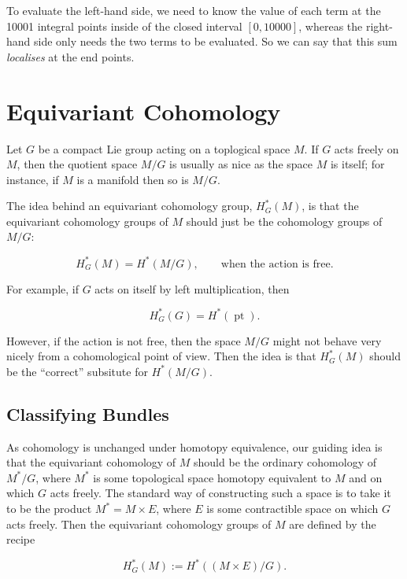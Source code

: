 \documentclass{article}
\DeclareMathOperator{\pt}{pt}
\begin{document}
To evaluate the left-hand side, we need to know the value of each term at the 10001 integral points inside of the closed interval $[0, 10000]$, whereas the right-hand side only needs the two terms to be evaluated. So we can say that this sum \emph{localises} at the end points.

\section{Equivariant Cohomology}

Let $G$ be a compact Lie group acting on a toplogical space $M$. If $G$ acts freely on $M$, then the quotient space $M/G$ is usually as nice as the space $M$ is itself; for instance, if $M$ is a manifold then so is $M/G$.

The idea behind an equivariant cohomology group, $H_{G}^{\ast}(M)$, is that the equivariant cohomology groups of $M$ should just be the cohomology groups of $M/G$:

\begin{equation*}
	H_{G}^{\ast}(M) = H^{\ast}(M/G), \qquad \text{when the action is free.}
\end{equation*}

For example, if $G$ acts on itself by left multiplication, then

\begin{equation*}
	H_{G}^{\ast}(G) = H^{\ast}(\pt).
\end{equation*}

However, if the action is not free, then the space $M/G$ might not behave very nicely from a cohomological point of view. Then the idea is that $H_{G}^{\ast}(M)$ should be the ``correct'' subsitute for $H^{\ast}(M/G)$.

\subsection{Classifying Bundles}

As cohomology is unchanged under homotopy equivalence, our guiding idea is that the equivariant cohomology of $M$ should be the ordinary cohomology of $M^{\ast}/G$, where $M^{\ast}$ is some topological space homotopy equivalent to $M$ and on which $G$ acts freely. The standard way of constructing such a space is to take it to be the product $M^{\ast} = M \times E$, where $E$ is some contractible space on which $G$ acts freely. Then the equivariant cohomology groups of $M$ are defined by the recipe

\begin{equation*}
	H_{G}^{\ast}(M) := H^{\ast}\left( (M \times E)/G \right).
\end{equation*}
\end{document}
